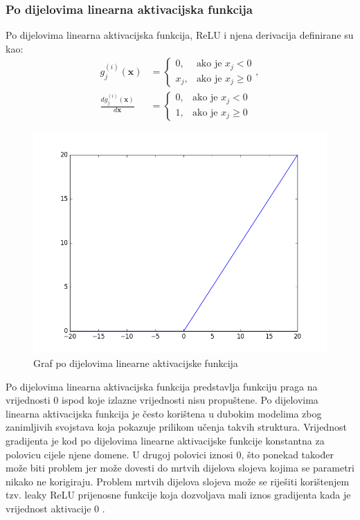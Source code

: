 \documentclass[times, utf8, diplomski, numeric]{fer}
\begin{document}
\subsubsection{Po dijelovima linearna aktivacijska funkcija}
Po dijelovima linearna aktivacijska funkcija, ReLU  i njena derivacija definirane su kao:
\begin{align}
 g^{(i)}_j(\mathbf{x})&=\left\{
 \begin{array}{ll}
 0,  & \mbox{ako je } x_j < 0 \\
 x_j, & \mbox{ako je } x_j \geq 0 
 \end{array}
 \right. , \\
 \frac{dg^{(i)}_j(\mathbf{x})}{d\mathbf{x}}&=\left\{
 \begin{array}{ll}
 0,  & \mbox{ako je } x_j < 0 \\
 1, & \mbox{ako je } x_j \geq 0 
 \end{array}
 \right.
\end{align}

\begin{figure}[H]
\centering
\includegraphics[scale=0.5]{images/relu_graph.png}
\caption{Graf po dijelovima linearne aktivacijske funkcija}
\label{img:relu_graph}
\end{figure}

\noindent Po dijelovima linearna aktivacijska funkcija predstavlja funkciju praga na vrijednosti $0$ ispod koje izlazne vrijednosti nisu propuštene.
Po dijelovima linearna aktivacijska funkcija je često korištena u dubokim modelima zbog zanimljivih svojstava koja pokazuje prilikom učenja takvih struktura.
Vrijednost gradijenta je kod po dijelovima linearne aktivacijske funkcije konstantna za polovicu cijele njene domene. 
U drugoj polovici iznosi $0$, što ponekad također može biti problem jer može dovesti do mrtvih dijelova slojeva kojima se parametri nikako ne korigiraju.
Problem mrtvih dijelova slojeva može se riješiti korištenjem tzv. leaky ReLU prijenosne funkcije koja dozvoljava mali iznos gradijenta kada je vrijednost aktivacije $0$ \citep{book:deeplearningbook} \citep{seminar:rela}.
\end{document}

